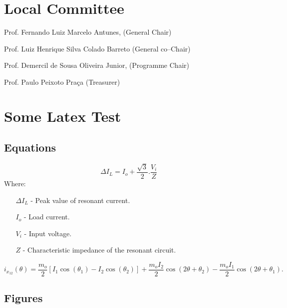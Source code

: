\documentclass[letterpaper,oneside,onecolumn,draftclsnofoot,12pt,conference]{IEEEtran}
\begin{document}
\section*{Local Committee}


Prof. Fernando Luiz Marcelo Antunes, (General Chair)  
 
Prof. Luiz Henrique Silva Colado Barreto (General co--Chair) 

Prof. Demercil de Sousa Oliveira Junior, (Programme Chair)

Prof. Paulo Peixoto Praça (Treasurer)





\section{Some Latex Test}

 
 \subsection{Equations}
 \begin{equation}
 \Delta I_{L}=I_{o}+\frac{\sqrt{3}}{2}.\frac{V_{i}}{Z}
 \end{equation}
 Where:
 
 \begin{enumerate}
 	\item[$\Delta I_{L}$]  - Peak value of resonant current.
 	\item[$I_{o}$]  - Load current.
 	\item[$V_{i}$]  - Input voltage.
 	\item[$Z$]  - Characteristic impedance of the resonant circuit.
 \end{enumerate}
 
  \begin{equation} \label{eq:ix12}
  {i_{{x_{12}}}}\left( \theta  \right) = \frac{{{m_o}}}{2}\left[ {{I_1}\cos \left( {{\theta _1}} \right) - {I_2}\cos \left( {{\theta _2}} \right)} \right]
  + \frac{{{m_o}{I_2}}}{2}\cos \left( {2\theta  + {\theta _2}} \right) - \frac{{{m_o}{I_1}}}{2}\cos \left( {2\theta  + {\theta _1}} \right).	
  \end{equation}
  
  
 \subsection{Figures}
 
\end{document}
